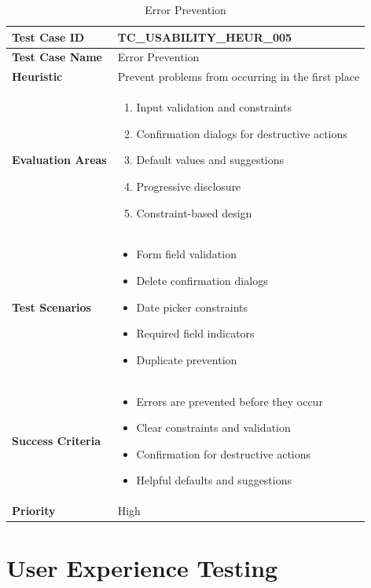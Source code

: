 \documentclass[12pt,a4paper]{article}
\begin{document}
\begin{longtable}{|p{3cm}|p{12cm}|}
\caption{Error Prevention} \\
\hline
\rowcolor{lightgray}
\textbf{Test Case ID} & \textbf{TC\_USABILITY\_HEUR\_005} \\
\hline
\textbf{Test Case Name} & Error Prevention \\
\hline
\textbf{Heuristic} & Prevent problems from occurring in the first place \\
\hline
\textbf{Evaluation Areas} & 
\begin{enumerate}[nosep]
    \item Input validation and constraints
    \item Confirmation dialogs for destructive actions
    \item Default values and suggestions
    \item Progressive disclosure
    \item Constraint-based design
\end{enumerate} \\
\hline
\textbf{Test Scenarios} & 
\begin{itemize}[nosep]
    \item Form field validation
    \item Delete confirmation dialogs
    \item Date picker constraints
    \item Required field indicators
    \item Duplicate prevention
\end{itemize} \\
\hline
\textbf{Success Criteria} & 
\begin{itemize}[nosep]
    \item Errors are prevented before they occur
    \item Clear constraints and validation
    \item Confirmation for destructive actions
    \item Helpful defaults and suggestions
\end{itemize} \\
\hline
\textbf{Priority} & High \\
\hline
\end{longtable}

\section{User Experience Testing}
\end{document}
